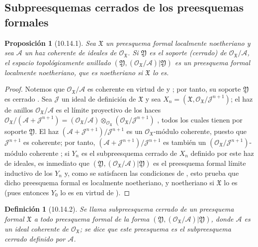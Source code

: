 \documentclass[oneside]{amsart}
\theoremstyle{ega-env-style}
\theoremstyle{ega-thm-env-style}
\newtheorem*{proposition}{Proposición}
\theoremstyle{ega-defn-env-style}
\newtheorem*{definition}{Definición}
\newcommand{\oldpage}[2][]{{\marginnote{\normalfont{\textbf{#1}~|~#2}}}\ignorespaces}
\let\EGAOriginalLabel\label
\renewcommand{\label}[1]{\phantomsection\EGAOriginalLabel{#1}}
\newcommand{\erratum}[2][]{{#2}\marginpar{\footnotesize\textbf{Err}\textsubscript{#1}}}
\begin{document}
\subsection{Subpreesquemas cerrados de los preesquemas formales}
\label{subsection:I.10.14}

\begin{proposition}[10.14.1]
\label{I.10.14.1}
Sea $\mathfrak{X}$ un preesquema formal localmente noetheriano y sea $\mathscr{A}$ un haz coherente de ideales de $\mathscr{O}_{\mathfrak{X}}$.
Si $\mathfrak{Y}$ es el soporte (cerrado) de $\mathscr{O}_{\mathfrak{X}}/\mathscr{A}$, el espacio topológicamente anillado $(\mathfrak{Y},(\mathscr{O}_{\mathfrak{X}}/\mathscr{A})|\mathfrak{Y})$ es un preesquema formal localmente noetheriano, que es noetheriano si $\mathfrak{X}$ lo es.
\end{proposition}

\begin{proof}
Notemos que $\mathscr{O}_{\mathfrak{X}}/\mathscr{A}$ es coherente en virtud de  y ; por tanto, su soporte $\mathfrak{Y}$ es cerrado .
Sea $\mathscr{J}$ un ideal de definición de $\mathfrak{X}$ y sea $X_n=(\mathfrak{X},\mathscr{O}_{\mathfrak{X}}/\mathscr{J}^{n+1})$;
el haz de anillos $\mathscr{O}_{\mathfrak{X}}/\mathscr{A}$ es el límite proyectivo de los haces $\mathscr{O}_{\mathfrak{X}}/(\mathscr{A}+\mathscr{J}^{n+1})
=(\mathscr{O}_{\mathfrak{X}}/\mathscr{A})
\otimes_{\mathscr{O}_{\mathfrak{X}}}
(\mathscr{O}_{\mathfrak{X}}/\mathscr{J}^{n+1})$ , todos los cuales tienen por soporte $\mathfrak{Y}$.
El haz $(\mathscr{A}+\mathscr{J}^{n+1})/\mathscr{J}^{n+1}$ es un $\mathscr{O}_{\mathfrak{X}}$-módulo coherente, puesto que $\mathscr{J}^{n+1}$ es coherente; por tanto, $(\mathscr{A}+\mathscr{J}^{n+1})/\mathscr{J}^{n+1}$ es también un $(\mathscr{O}_{\mathfrak{X}}/\mathscr{J}^{n+1})$-módulo coherente ;
si $Y_n$ es el subpreesquema cerrado de $X_n$ definido por este haz de ideales, es inmediato que $(\mathfrak{Y},(\mathscr{O}_{\mathfrak{X}}/\mathscr{A})|\mathfrak{Y})$
\oldpage[I]{210}
es el preesquema formal límite inductivo de los $Y_n$ y, como se satisfacen las condiciones de , esto prueba que dicho preesquema formal es localmente noetheriano, y noetheriano si $\mathfrak{X}$ lo es (pues entonces $Y_0$ lo es en virtud de ).
\end{proof}

\begin{definition}[10.14.2]
\label{I.10.14.2}
{\itshape Se llama subpreesquema cerrado de un preesquema formal $\mathfrak{X}$ a todo preesquema formal de la forma $(\mathfrak{Y},(\mathscr{O}_{\mathfrak{X}}/\mathscr{A})|\mathfrak{Y})$, donde $\mathscr{A}$ es un \erratum[II]{ideal coherente de $\mathscr{O}_{\mathfrak{X}}$};
se dice que este preesquema es el subpreesquema cerrado definido por $\mathscr{A}$.}
\end{definition}
\end{document}
